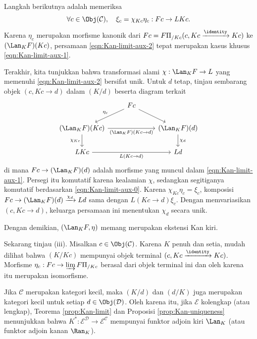\begin{bukti}
	Langkah berikutnya adalah memeriksa
	\begin{equation}\label{eqn:Kan-limit-aux-2}
		\forall c \in \Obj(\mathcal{C}), \quad \xi_c = \chi_{Kc} \eta_c: Fc \to LKc.
	\end{equation}
	Karena $\eta_c$ merupakan morfisme kanonik dari
	$Fc = F\Pi_{/Kc}(c, Kc \xrightarrow{\identity} Kc)$ ke
	$(\Lan_K F)(Kc)$, persamaan \eqref{eqn:Kan-limit-aux-2} tepat merupakan
	kasus khusus \eqref{eqn:Kan-limit-aux-1}.

	Terakhir, kita tunjukkan bahwa transformasi alami
	$\chi: \Lan_K F \to L$ yang memenuhi \eqref{eqn:Kan-limit-aux-2} bersifat
	unik. Untuk $d$ tetap, tinjau sembarang objek $(c, Kc \to d)$ dalam $(K/d)$
	beserta diagram terkait
	\[\begin{tikzcd}
		& Fc \arrow[ld, "{\eta_c}"'] \arrow[rd] & \\
		(\Lan_K F)(Kc) \arrow[rr, "{(\Lan_K F)(Kc \to d)}"'] \arrow[d, "{\chi_{Kc}}"'] & & (\Lan_K F)(d) \arrow[d, "\chi_d"] \\
 		LKc \arrow[rr, "{L(Kc \to d)}"'] & & Ld
	\end{tikzcd}\]
	di mana $Fc \to (\Lan_K F)(d)$ adalah morfisme yang muncul dalam
	\eqref{eqn:Kan-limit-aux-1}. Persegi itu komutatif karena kealamian
	$\chi$, sedangkan segitiganya komutatif berdasarkan
	\eqref{eqn:Kan-limit-aux-0}. Karena
	$\chi_{Kc} \eta_c = \xi_c$, komposisi
	$Fc \to (\Lan_K F)(d) \xrightarrow{\chi_d} Ld$ sama dengan
	$L(Kc \to d) \xi_c$. Dengan memvariasikan $(c, Kc \to d)$, keluarga
	persamaan ini menentukan $\chi_d$ secara unik.

	Dengan demikian, $\left( \Lan_K F, \eta \right)$ memang merupakan ekstensi
	Kan kiri.

	Sekarang tinjau (iii). Misalkan $c \in \Obj(\mathcal{C})$. Karena $K$ penuh
	dan setia, mudah dilihat bahwa $(K/Kc)$ mempunyai objek terminal
	$(c, Kc \xrightarrow{\identity} Kc)$. Morfisme
	$\eta_c: Fc \to \varinjlim F\Pi_{/Kc}$ berasal dari objek terminal ini dan
	oleh karena itu merupakan isomorfisme.
\end{bukti}

\begin{catatan}
	Jika $\mathcal{C}$ merupakan kategori kecil, maka $(K/d)$ dan $(d/K)$ juga
	merupakan kategori kecil untuk setiap $d \in \Obj(\mathcal{D})$. Oleh karena
	itu, jika $\mathcal{E}$ kolengkap (atau lengkap), Teorema
	\ref{prop:Kan-limit} dan Proposisi \ref{prop:Kan-uniqueness} menunjukkan
	bahwa $K^*: \mathcal{E}^{\mathcal{D}} \to
	\mathcal{E}^{\mathcal{C}}$ mempunyai funktor adjoin kiri $\Lan_K$ (atau
	funktor adjoin kanan $\Ran_K$).
\end{catatan}

